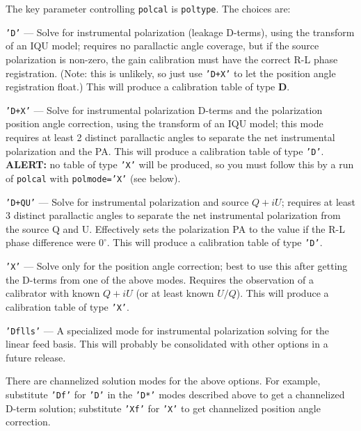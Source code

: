 The key parameter controlling {\tt polcal} is {\tt poltype}.  The
choices are:
\begin{description}
\item{\tt 'D'} --- Solve for instrumental polarization (leakage D-terms),
using the transform of an IQU model; requires no
parallactic angle coverage, but if the source polarization is non-zero,
the gain calibration must have the correct R-L phase registration.
(Note: this is unlikely, so just use {\tt 'D+X'} to let the position
angle registration float.) This will produce a calibration table of
type {\bf D}.

\item{\tt 'D+X'} --- Solve for instrumental polarization D-terms and
the polarization position angle correction, using the transform of an
IQU model; this mode requires at least 2 distinct
parallactic angles to separate the net instrumental polarization and
the PA. This will produce a calibration table of
type {\tt 'D'}. {\bf ALERT:} no table of type {\tt 'X'} will be
produced, so you must follow this by a run of {\tt polcal} with
{\tt polmode='X'} (see below).

\item{\tt 'D+QU'} --- Solve for instrumental polarization and source 
$Q+iU$; requires at least 3 distinct parallactic angles to separate
the net instrumental polarization from the source Q and U.
Effectively sets the polarization PA to the value if the R-L phase
difference were $0^\circ$.  This will produce a calibration table of
type {\tt 'D'}. 

\item{\tt 'X'} --- Solve only for the position angle correction; best to use
this after getting the D-terms from one of the above modes.  Requires
the observation of a calibrator with known $Q+iU$ (or at least known $U/Q$).
This will produce a calibration table of type {\tt 'X'}. 

\item{\tt 'Dflls'} --- A specialized mode for instrumental
polarization solving for the linear feed basis.  This will probably
be consolidated with other options in a future release.

\end{description}

There are channelized solution modes for the above options.  For
example, substitute {\tt 'Df'} for {\tt 'D'} in the {\tt 'D*'} modes 
described above to get a channelized D-term solution; substitute 
{\tt 'Xf'} for {\tt 'X'} to get channelized position angle correction.

